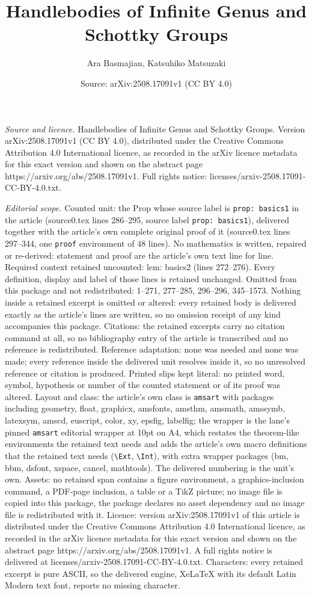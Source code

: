 \documentclass[10pt,a4paper]{amsart}
\title[Handlebodies of Infinite Genus and Schottky Groups]{Handlebodies of Infinite Genus and Schottky Groups}
\author{Ara Basmajian, Katsuhiko Matsuzaki}
\date{Source: arXiv:2508.17091v1 (CC BY 4.0)}
\begin{document}
\maketitle

\noindent\emph{Source and licence.} Handlebodies of Infinite Genus and Schottky Groups. Version arXiv:2508.17091v1 (CC BY 4.0), distributed under the Creative Commons Attribution 4.0 International licence, as recorded in the arXiv licence metadata for this exact version and shown on the abstract page https://arxiv.org/abs/2508.17091v1. Full rights notice: licenses/arxiv-2508.17091-CC-BY-4.0.txt.\par\smallskip

\noindent\textit{Editorial scope.} Counted unit: the Prop whose source label is \texttt{prop: basics1} in the article (source0.tex lines 286--295, source label \texttt{prop: basics1}), delivered together with the article's own complete original proof of it (source0.tex lines 297--344, one \texttt{proof} environment of 48 lines). No mathematics is written, repaired or re-derived: statement and proof are the article's own text line for line. Required context retained uncounted: lem: basics2 (lines 272--276). Every definition, display and label of those lines is retained unchanged. Omitted from this package and not redistributed: 1--271, 277--285, 296--296, 345--1573. Nothing inside a retained excerpt is omitted or altered: every retained body is delivered exactly as the article's lines are written, so no omission receipt of any kind accompanies this package. Citations: the retained excerpts carry no citation command at all, so no bibliography entry of the article is transcribed and no reference is redistributed. Reference adaptation: none was needed and none was made; every reference inside the delivered unit resolves inside it, so no unresolved reference or citation is produced. Printed slips kept literal: no printed word, symbol, hypothesis or number of the counted statement or of its proof was altered. Layout and class: the article's own class is \texttt{amsart} with packages including geometry, float, graphicx, amsfonts, amsthm, amsmath, amssymb, latexsym, amscd, euscript, color, xy, epsfig, labelfig; the wrapper is the lane's pinned \texttt{amsart} editorial wrapper at 10pt on A4, which restates the theorem-like environments the retained text needs and adds the article's own macro definitions that the retained text needs (\texttt{\textbackslash Ext}, \texttt{\textbackslash Int}), with extra wrapper packages (bm, bbm, dsfont, xspace, cancel, mathtools). The delivered numbering is the unit's own. Assets: no retained span contains a figure environment, a graphics-inclusion command, a PDF-page inclusion, a table or a TikZ picture; no image file is copied into this package, the package declares no asset dependency and no image file is redistributed with it. Licence: version arXiv:2508.17091v1 of this article is distributed under the Creative Commons Attribution 4.0 International licence, as recorded in the arXiv licence metadata for this exact version and shown on the abstract page https://arxiv.org/abs/2508.17091v1. A full rights notice is delivered at licenses/arxiv-2508.17091-CC-BY-4.0.txt. Characters: every retained excerpt is pure ASCII, so the delivered engine, XeLaTeX with its default Latin Modern text font, reports no missing character.
\end{document}
